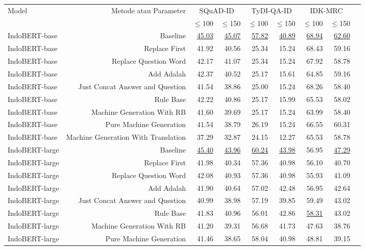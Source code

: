 \begin{table}[H]\centering
\scriptsize
\begin{tabular}{lrrrrrrrr}\toprule
\multirow{2}{*}{Model} &\multirow{2}{*}{Metode atau Parameter} &\multicolumn{2}{c}{SQuAD-ID} &\multicolumn{2}{c}{TyDI-QA-ID} &\multicolumn{2}{c}{IDK-MRC} \\\cmidrule{3-8}
& &$\leq$100 &$\leq$150 &$\leq$100 &$\leq$150 &$\leq$100 &$\leq$150 \\\midrule
IndoBERT-base &Baseline &\underline{45.03} &\underline{45.07} &\underline{57.82} &\underline{40.89} &\underline{68.94} &\underline{62.60} \\
IndoBERT-base &Replace First &41.92 &40.56 &25.34 &15.24 &68.43 &59.16 \\
IndoBERT-base &Replace Question Word &42.17 &41.07 &25.34 &15.24 &67.92 &58.78 \\
IndoBERT-base &Add Adalah &42.37 &40.52 &25.17 &15.61 &64.85 &59.16 \\
IndoBERT-base &Just Concat Answer and Question &41.54 &38.86 &25.00 &15.24 &68.26 &58.40 \\
IndoBERT-base &Rule Base &42.22 &40.86 &25.17 &15.99 &65.53 &58.02 \\
IndoBERT-base &Machine Generation With RB &41.60 &39.69 &25.17 &15.24 &63.99 &58.40 \\
IndoBERT-base &Pure Machine Generation &41.54 &38.79 &26.19 &15.24 &66.55 &60.31 \\
IndoBERT-base &Machine Generation With Translation &37.29 &32.87 &24.15 &12.27 &65.53 &58.78 \\
\hline
IndoBERT-large &Baseline &\underline{45.40} &\underline{43.96} &\underline{60.24} &\underline{43.98} &56.95 &\underline{47.29} \\
IndoBERT-large &Replace First &41.98 &40.34 &57.36 &40.98 &56.10 &40.70 \\
IndoBERT-large &Replace Question Word &42.08 &40.93 &57.36 &40.98 &55.93 &41.09 \\
IndoBERT-large &Add Adalah &41.90 &40.64 &57.02 &42.48 &56.95 &42.64 \\
IndoBERT-large &Just Concat Answer and Question &40.99 &38.98 &57.19 &39.85 &59.49 &43.02 \\
IndoBERT-large &Rule Base &41.83 &40.96 &56.01 &42.86 &\underline{58.31} &43.02 \\
IndoBERT-large &Machine Generation With RB &41.20 &39.31 &56.68 &41.73 &47.63 &38.76 \\
IndoBERT-large &Pure Machine Generation &41.46 &38.65 &58.04 &40.98 &48.81 &39.15 \\

\end{tabular}
\end{table}
